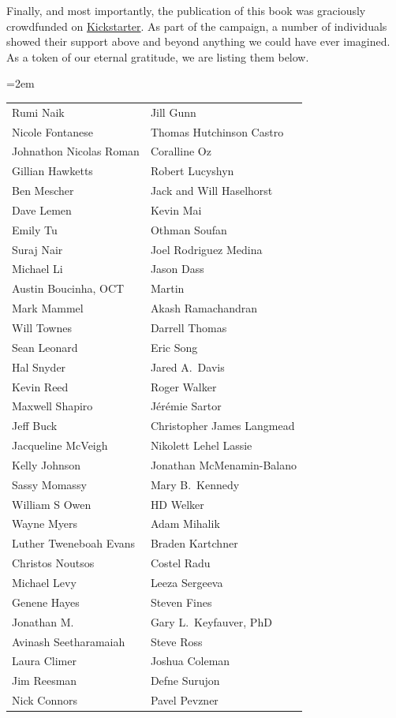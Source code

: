 Finally, and most importantly, the publication of this book was graciously crowdfunded on \href{https://www.kickstarter.com/projects/phillipcompeau/biological-modeling-a-short-tour?ref=user_menu}{Kickstarter}. As part of the campaign, a number of individuals showed their support above and beyond anything we could have ever imagined. As a token of our eternal gratitude, we are listing them below.
\begin{center}
\tabcolsep=2em
\begin{tabular}{l l}
Rumi Naik & Jill Gunn\\
Nicole Fontanese & Thomas Hutchinson Castro\\
Johnathon Nicolas Roman & Coralline Oz\\
Gillian Hawketts & Robert Lucyshyn\\
Ben Mescher & Jack and Will Haselhorst\\
Dave Lemen & Kevin Mai\\
Emily Tu & Othman Soufan\\
Suraj Nair & Joel Rodriguez Medina\\
Michael Li & Jason Dass\\
Austin Boucinha, OCT & Martin\\
Mark Mammel & Akash Ramachandran\\
Will Townes & Darrell Thomas\\
Sean Leonard & Eric Song\\
Hal Snyder & Jared A.~Davis\\
Kevin Reed & Roger Walker\\
Maxwell Shapiro & Jérémie Sartor\\
Jeff Buck & Christopher James Langmead\\
Jacqueline McVeigh & Nikolett Lehel Lassie\\
Kelly Johnson & Jonathan McMenamin-Balano\\
Sassy Momassy & Mary B.~Kennedy\\
William S Owen & HD Welker\\
Wayne Myers & Adam Mihalik\\
Luther Tweneboah Evans & Braden Kartchner\\
Christos Noutsos & Costel Radu\\
Michael Levy & Leeza Sergeeva\\
Genene Hayes & Steven Fines\\
Jonathan M. & Gary L.~Keyfauver, PhD\\
Avinash Seetharamaiah & Steve Ross\\
Laura Climer & Joshua Coleman\\
Jim Reesman & Defne Surujon\\
Nick Connors & Pavel Pevzner\\
\end{tabular}
\end{center}


